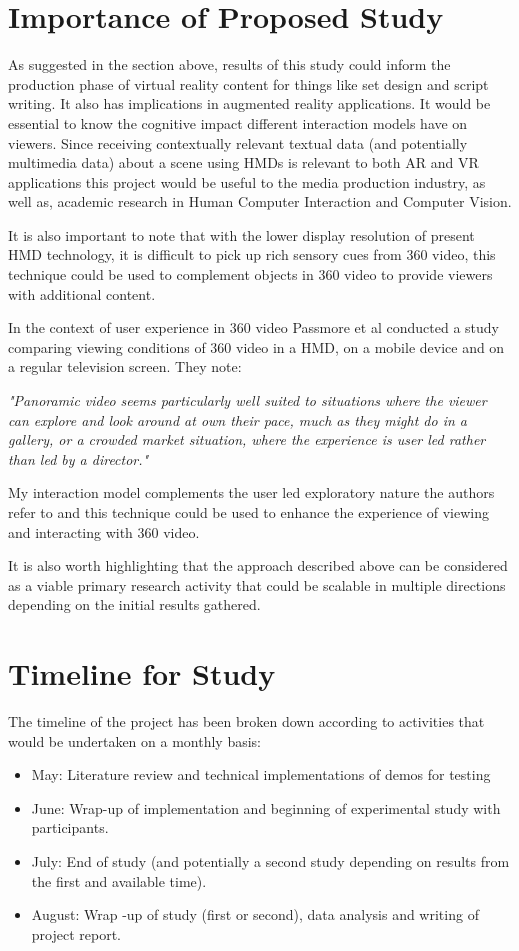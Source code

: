 \documentclass{article}
\begin{document}
{\section{Importance of Proposed Study} \label{Importance}
As suggested in the section above, results of this study could inform the production phase of virtual reality content for things like set design  and script writing. It also has implications in augmented reality applications. It would be essential to know the cognitive impact different interaction models have on viewers. Since receiving contextually relevant textual data (and potentially  multimedia data) about a scene using HMDs is relevant to both AR and VR applications this project would be useful to the media production industry, as well as, academic research in Human Computer Interaction and Computer Vision. 

It is also important to note that with the lower display resolution of present HMD technology, it is difficult to pick up rich sensory cues from 360 video, this technique could be used to complement objects in 360 video to provide viewers with additional content.  

In the context of user experience in 360 video Passmore et al \cite{passmore2016effects} conducted a study comparing viewing conditions of 360 video in a HMD, on a mobile device and on a regular television screen. They note: 

\textit{"Panoramic video seems particularly well suited to situations where the viewer can explore and look around at own their pace, much as they might do in a gallery, or a crowded market situation, where the experience is user led rather than led by a director."}\cite{passmore2016effects}

My interaction model complements the user led exploratory nature the authors refer to and this technique could be used to enhance the experience of viewing and interacting with 360 video.

It is also worth highlighting that the approach described above can be considered as a viable primary research activity that could be scalable in multiple directions depending on the initial results gathered. 

\section{Timeline for Study} \label{Timeline}
The timeline of the project has been broken down according to activities that would be undertaken on a monthly basis:
\begin{itemize}
\item May: Literature review and technical implementations of demos for testing
\item June: Wrap-up of implementation and beginning of experimental study with participants.
\item July: End of study (and potentially a second study depending on results from the first and available time). 
\item August: Wrap -up of study (first or second), data analysis and writing of project report.
\end{itemize}

}
\end{document}
